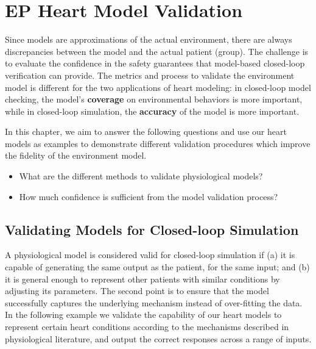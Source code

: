 \section{EP Heart Model Validation}
Since models are approximations of the actual environment, there are always discrepancies between the model and the actual patient (group). The challenge is to evaluate the confidence in the safety guarantees that model-based closed-loop verification can provide. The metrics and process to validate the environment model is different for the two applications of heart modeling: in closed-loop model checking, the model's \textbf{coverage} on environmental behaviors is more important, while in closed-loop simulation, the \textbf{accuracy} of the model is more important. 

In this chapter, we aim to answer the following questions and use our heart models as examples to demonstrate different validation procedures which improve the fidelity of the environment model. 
\begin{itemize}
	\vspace{-5pt}
	\item What are the different methods to validate physiological models?
	\vspace{-5pt}
	\item How much confidence is sufficient from the model validation process?
\end{itemize}

\subsection{Validating Models for Closed-loop Simulation}
A physiological model is considered valid for closed-loop simulation if (a) it is capable of generating the same output as the patient, for the same input; and (b) it is general enough to represent other patients with similar conditions by adjusting its parameters. The second point is to ensure that the model successfully captures the underlying mechanism instead of over-fitting the data. In the following example we validate the capability of our heart models to represent certain heart conditions according to the mechanisms described in physiological literature, and  output the correct responses across a range of inputs.\\

